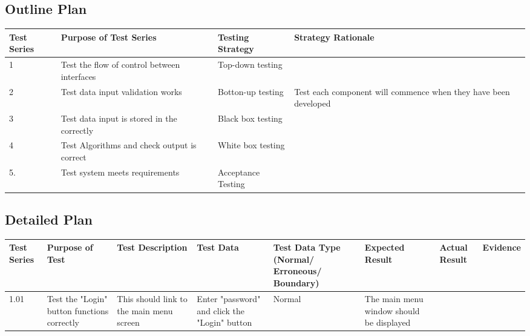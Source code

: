 \begin{landscape}
\subsection{Outline Plan}

\begin{center}
    \begin{tabular}{|p{3cm}|p{3.5cm}|p{4cm}|p{6cm}|}
        \hline
        \textbf{Test Series} & \textbf{Purpose of Test Series} & \textbf{Testing Strategy} & \textbf{Strategy Rationale}\\ \hline
        1 & Test the flow of control between interfaces      & Top-down testing     & \\ \hline
        2 & Test data input validation works                 & Botton-up testing    & Test each component will commence when they have been developed\\ \hline
        3 & Test data input is stored in the correctly       & Black box testing    & \\ \hline
        4 & Test Algorithms and check output is correct      & White box testing    & \\ \hline
        5.& Test system meets requirements                   & Acceptance Testing   & \\ \hline
    \end{tabular}
\end{center}

\newpage

\subsection{Detailed Plan}

\begin{center}
    \begin{longtable}{|p{1.5cm}|p{2cm}|p{3cm}|p{2cm}|p{2cm}|p{2.5cm}|p{2cm}|p{2cm}|}
        \hline
        \textbf{Test Series} & \textbf{Purpose of Test} & \textbf{Test Description} & \textbf{Test Data} & \textbf{Test Data Type (Normal/ Erroneous/ Boundary)} & \textbf{Expected Result} & \textbf{Actual Result} & \textbf{Evidence}\\ \hline
        
        1.01 & Test the "Login" button functions correctly & This should link to the main menu screen & Enter "password" and click the "Login" button & Normal & The 
        main menu window should be displayed  & & \\ \hline
        

\end{longtable}
\end{center}
\end{landscape}
